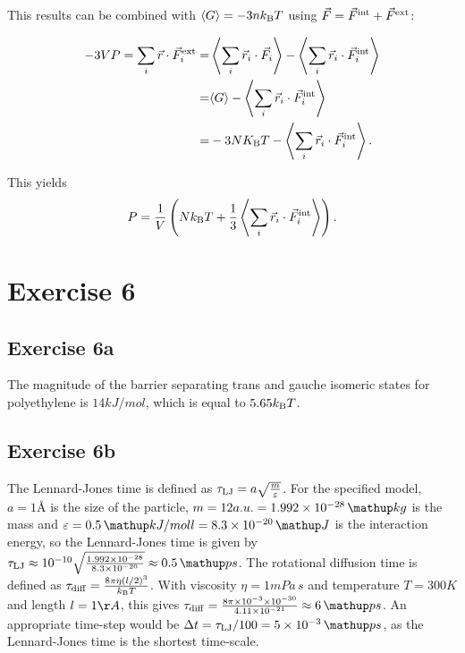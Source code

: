 \documentclass[titlepage]{report}
\begin{document}
This results can be combined with $ \langle G \rangle = -3 n k_{\rm{B}} T $ using $ \vec{F} = \vec{F}^{\rm{int}} + \vec{F}^{\rm{ext}} $:

\begin{subequations}
	\begin{align}
		-3 V P = \sum_i \vec{r} \cdot \vec{F}_i^{\rm{ext}} =& \left\langle \sum_i \vec{r}_i \cdot \vec{F}_i \right\rangle - \left\langle \sum_i \vec{r}_i \cdot \vec{F}_i^{\rm{int}} \right\rangle\\
		=& \langle G \rangle - \left\langle \sum_i \vec{r}_i \cdot \vec{F}_i^{\rm{int}} \right\rangle\\
		=& -3 N K_{\rm{B}} T - \left\langle \sum_i \vec{r}_i \cdot \vec{F}_i^{\rm{int}} \right\rangle.
	\end{align}
\end{subequations}

This yields
\begin{equation}
P = \frac{1}{V} \left( N k_{\rm{B}} T + \frac{1}{3} \left\langle \sum_i \vec{r}_i \cdot \vec{F}_i^{\rm{int}} \right\rangle \right).
\end{equation}

\section{Exercise 6}
\subsection{Exercise 6a}
The magnitude of the barrier separating trans and gauche isomeric states for polyethylene is $ 14 \unit{kJ / mol} $, which is equal to $ 5.65 k_{\rm{B}} T $.

\subsection{Exercise 6b}
The Lennard-Jones time is defined as $ \tau_{\rm{LJ}} = a\sqrt{\frac{m}{\varepsilon}} $.
For the specified model, $ a = 1 \textrm{\AA} $ is the size of the particle, $ m = 12 a.u. = 1.992 \E{-28} \unit{kg} $ is the mass and $ \varepsilon = 0.5 \unit{kJ / moll} = 8.3 \E{-20} \unit{J} $ is the interaction energy, so the Lennard-Jones time is given by $ \tau\sub{LJ} \approx 10^{-10} \sqrt{\frac{1.992 \E{-28}}{8.3 \E{-20}}} \approx 0.5 \unit{ps} $.
The rotational diffusion time is defined as $ \tau_{\rm{diff}} = \frac{8 \pi \eta (l/2)^3}{k_{\rm{B}} T} $.
With viscosity $ \eta = 1 \unit{mPa \, s} $ and temperature $ T = 300 \unit{K} $ and length $ l = 1 \AA $, this gives $ \tau\sub{diff} = \frac{8 \pi \E{-3} \E{-30}}{4.11\E{-21}} \approx 6\unit{ps} $.
An appropriate time-step would be $ \Delta t = \tau\sub{LJ} / 100 = 5 \E{-3} \unit{ps} $, as the Lennard-Jones time is the shortest time-scale. 
\end{document}
